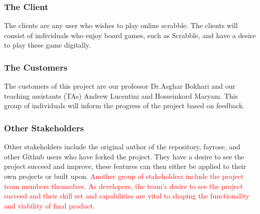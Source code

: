 \documentclass[12pt, titlepage]{article}
\begin{document}
\subsubsection{The Client}
    The clients are any user who wishes to play online scrabble. The clients will consist of individuals who enjoy board games, such as Scrabble, and have a desire to play these game digitally. 
\subsubsection{The Customers}
    The customers of this project are our professor Dr.Asghar Bokhari and our
    teaching assistants (TAs) Andrew Lucentini and Hosseinkord Maryam. This group of individuals will inform the progress of the project based on feedback.
\subsubsection{Other Stakeholders}
    Other stakeholders include the original author of the repository, fayrose, and other Github users who have forked the project. They have a desire to see the project succeed and improve, these features can then either be applied to their own projects or built upon. \textcolor{red}{Another group of stakeholders include the project team members themselves. As developers, the team's desire to see the project succeed and their skill set and capabilities are vital to shaping the functionality and viability of final product.}
    
\end{document}
